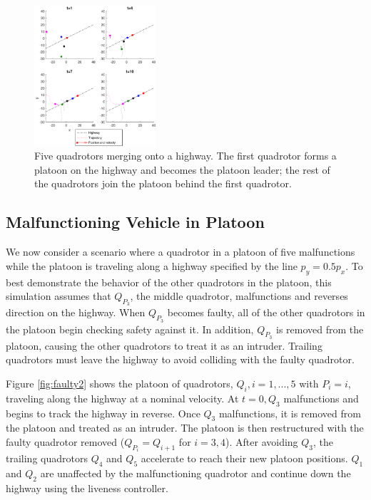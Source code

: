 \begin{figure}
	\centering
	\includegraphics[width=0.4\textwidth]{"fig/normal5"}
	\caption{Five quadrotors merging onto a highway. The first quadrotor forms a platoon on the highway and becomes the platoon leader; the rest of the quadrotors join the platoon behind the first quadrotor.}
	\label{fig:normal5}
\end{figure}

\subsection{Malfunctioning Vehicle in Platoon}
We now consider a scenario where a quadrotor in a platoon of five malfunctions while the platoon is traveling along a highway specified by the line $p_y = 0.5p_x$. To best demonstrate the behavior of the other quadrotors in the platoon, this simulation assumes that $Q_{P_3}$, the middle quadrotor, malfunctions and reverses direction on the highway. When $Q_{P_3}$ becomes faulty, all of the other quadrotors in the platoon begin checking safety against it. In addition, $Q_{P_3}$ is removed from the platoon, causing the other quadrotors to treat it as an intruder.  Trailing quadrotors must leave the highway to avoid colliding with the faulty quadrotor. 

Figure \ref{fig:faulty2} shows the platoon of quadrotors, $Q_i,i = 1,...,5$ with $P_i = i$, traveling along the highway at a nominal velocity. At $t=0, Q_3$ malfunctions and begins to track the highway in reverse. Once $Q_3$ malfunctions, it is removed from the platoon and treated as an intruder. The platoon is then restructured with the faulty quadrotor removed ($Q_{P_i} = Q_{i+1}$ for $i=3,4$). After avoiding $Q_3$, the trailing quadrotors $Q_4$ and $Q_5$ accelerate to reach their new platoon positions. $Q_1$ and $Q_2$ are unaffected by the malfunctioning quadrotor and continue down the highway using the liveness controller. 

